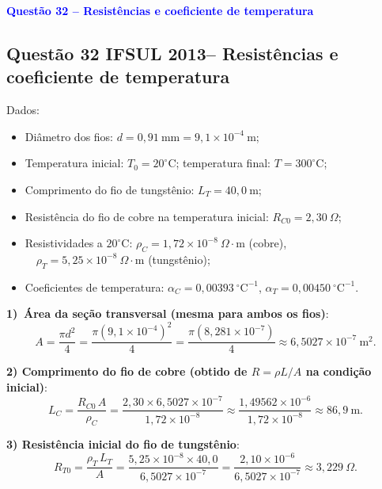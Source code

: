 \begin{flushleft}
\textbf{\textcolor{blue}{\Large Quest\~ao 32 -- Resist\^encias e coeficiente de temperatura}}\\

\subsection{Quest\~ao 32 IFSUL 2013-- Resist\^encias e coeficiente de temperatura}

\noindent Dados:

\begin{itemize}
\item Di\^ametro dos fios: $d=0{,}91\ \text{mm}=9{,}1\times10^{-4}\ \text{m}$;
\item Temperatura inicial: $T_0=20^\circ\text{C}$; temperatura final: $T=300^\circ\text{C}$;
\item Comprimento do fio de tungst\^enio: $L_T=40{,}0\ \text{m}$;
\item Resist\^encia do fio de cobre na temperatura inicial: $R_{C0}=2{,}30\ \Omega$;
\item Resistividades a $20^\circ\text{C}$: $\rho_C=1{,}72\times10^{-8}\ \Omega\cdot\text{m}$ (cobre),
$\quad \rho_T=5{,}25\times10^{-8}\ \Omega\cdot\text{m}$ (tungst\^enio);
\item Coeficientes de temperatura: $\alpha_C=0{,}00393\ ^\circ\text{C}^{-1}$, \; $\alpha_T=0{,}00450\ ^\circ\text{C}^{-1}$.
\end{itemize}

\bigskip

\textbf{1) \; \,\'Area da se\c{c}\~ao transversal (mesma para ambos os fios)}:
\[
A=\frac{\pi d^2}{4}=\frac{\pi(9{,}1\times10^{-4})^2}{4}
=\frac{\pi(8{,}281\times10^{-7})}{4}
\approx 6{,}5027\times10^{-7}\ \text{m}^2.
\]

\bigskip

\textbf{2) \; Comprimento do fio de cobre (obtido de $R=\rho L/A$ na condi\c{c}\~ao inicial)}:
\[
L_C=\frac{R_{C0}\,A}{\rho_C}
= \frac{2{,}30\times 6{,}5027\times10^{-7}}{1{,}72\times10^{-8}}
\approx \frac{1{,}49562\times10^{-6}}{1{,}72\times10^{-8}}
\approx 86{,}9\ \text{m}.
\]

\bigskip

\textbf{3) \; Resist\^encia inicial do fio de tungst\^enio}:
\[
R_{T0}=\frac{\rho_T\,L_T}{A}
=\frac{5{,}25\times10^{-8}\times 40{,}0}{6{,}5027\times10^{-7}}
=\frac{2{,}10\times10^{-6}}{6{,}5027\times10^{-7}}
\approx 3{,}229\ \Omega.
\]

\bigskip


\end{flushleft}
